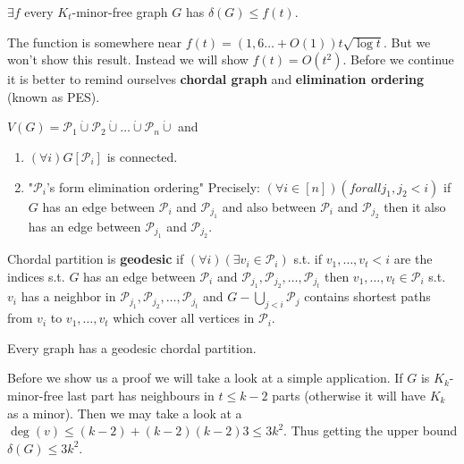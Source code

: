 \begin{thm}
	$\exists f$ every $K_{t}$-minor-free graph $G$ has $\delta(G) \leq f(t)$.
\end{thm}

The function is somewhere near $f(t) = (1,6\dots + O(1)) t \sqrt{\log t}$. But we won't show this result. Instead we will show $f(t) = O(t^{2})$. Before we continue it is better to remind ourselves \textbf{chordal graph} and \textbf{elimination ordering} (known as PES).

\begin{defn}
	$V(G) = \mathcal{P}_{1} \dot{\cup} \mathcal{P}_{2} \dot{\cup} \dots \dot{\cup} \mathcal{P}_{n} \dot{\cup}$ and
	
	\begin{enumerate}
		\item $(\forall i) G[\mathcal{P}_{i}]$ is connected.
		\item "$\mathcal{P}_{i}$'s form elimination ordering" Precisely: $(\forall i \in [n])(forall j_{1},j_{2} < i)$ if $G$ has an edge between $\mathcal{P}_{i}$ and $\mathcal{P}_{j_{1}}$ and also between $\mathcal{P}_{i}$ and $\mathcal{P}_{j_{2}}$ then it also has an edge between $\mathcal{P}_{j_{1}}$ and $\mathcal{P}_{j_{2}}$.
	\end{enumerate}
\end{defn}

\begin{defn}
	Chordal partition is \textbf{geodesic} if $(\forall i) (\exists v_{i} \in \mathcal{P}_{i})$ s.t. if $v_{1}, \dots, v_{t} < i$ are the indices s.t. $G$ has an edge between $\mathcal{P}_{i}$ and $\mathcal{P}_{j_{1}}, \mathcal{P}_{j_{2}}, \dots, \mathcal{P}_{j_{t}}$ then $v_{1}, \dots, v_{t} \in \mathcal{P}_{i}$ s.t. $v_{i}$ has a neighbor in $\mathcal{P}_{j_{1}}, \mathcal{P}_{j_{2}}, \dots, \mathcal{P}_{j_{t}}$ and $G - \bigcup_{j < i} \mathcal{P}_{j}$ contains shortest paths from $v_{i}$ to $v_{1}, \dots, v_{t}$ which cover all vertices in $\mathcal{P}_{i}$.
\end{defn}


\begin{thm}
	Every graph has a geodesic chordal partition.
\end{thm}

Before we show us a proof we will take a look at a simple application. If $G$ is $K_{k}$-minor-free last part has neighbours in $t \leq k-2$ parts (otherwise it will have $K_{k}$ as a minor). Then we may take a look at a $\deg(v) \leq (k-2) + (k-2)(k-2)3 \leq 3k^{2}$. Thus getting the upper bound $\delta(G) \leq 3k^{2}$.

